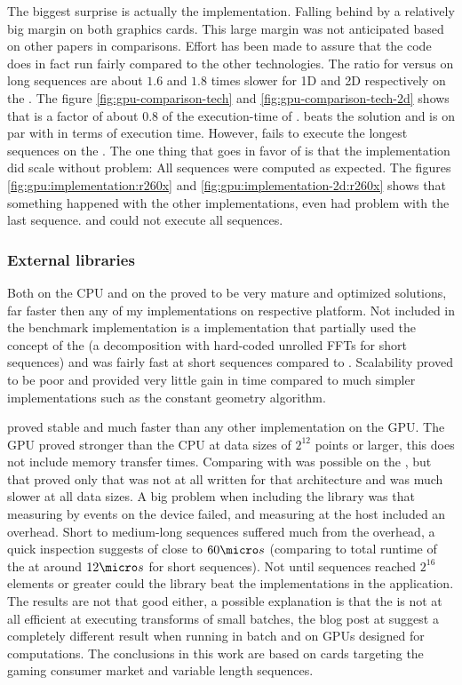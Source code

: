 The biggest surprise is actually the {\OCL} implementation. Falling behind by a relatively big margin on both graphics cards. This large margin was not anticipated based on other papers in comparisons. Effort has been made to assure that the code does in fact run fairly compared to the other technologies. The ratio for {\OCL} versus {\CU} on long sequences are about $1.6$ and $1.8$ times slower for 1D and 2D respectively on the {\NVCARD}. The figure \ref{fig:gpu-comparison-tech} and \ref{fig:gpu-comparison-tech-2d} shows that {\DX} is a factor of about $0.8$ of the execution-time of {\OCL}. {\GL} beats the {\OCL} solution and is on par with {\DX} in terms of execution time. However, fails to execute the longest sequences on the {\AMDCARD}. The one thing that goes in favor of {\OCL} is that the implementation did scale without problem: All sequences were computed as expected. The figures \ref{fig:gpu:implementation:r260x} and \ref{fig:gpu:implementation-2d:r260x} shows that something happened with the other implementations, even {\CLFFT} had problem with the last sequence. {\GL} and {\DX} could not execute all sequences.

\subsubsection{External libraries}

Both {\FFTW} on the CPU and {\CUFFT} on the {\NVCARD} proved to be very mature and optimized solutions, far faster then any of my implementations on respective platform. Not included in the benchmark implementation is a {\CPP} implementation that partially used the concept of the {\FFTW} (a decomposition with hard-coded unrolled FFTs for short sequences) and was fairly fast at short sequences compared to {\FFTW}. Scalability proved to be poor and provided very little gain in time compared to much simpler implementations such as the constant geometry algorithm.

{\CUFFT} proved stable and much faster than any other implementation on the GPU. The GPU proved stronger than the CPU at data sizes of $2^{12}$ points or larger, this does not include memory transfer times. Comparing {\CUFFT} with {\CLFFT} was possible on the {\NVCARD}, but that proved only that {\CLFFT} was not at all written for that architecture and was much slower at all data sizes. A big problem when including the {\CLFFT} library was that measuring by events on the device failed, and measuring at the host included an overhead. Short to medium-long sequences suffered much from the overhead, a quick inspection suggests of close to $60{\micro}s$ (comparing to total runtime of the {\OCL} at around $12{\micro}s$ for short sequences). Not until sequences reached $2^{16}$ elements or greater could the library beat the implementations in the application. The results are not that good either, a possible explanation is that the {\CLFFT} is not at all efficient at executing transforms of small batches, the blog post at \cite{amd2015performance} suggest a completely different result when running in batch and on GPUs designed for computations. The conclusions in this work are based on cards targeting the gaming consumer market and variable length sequences.

